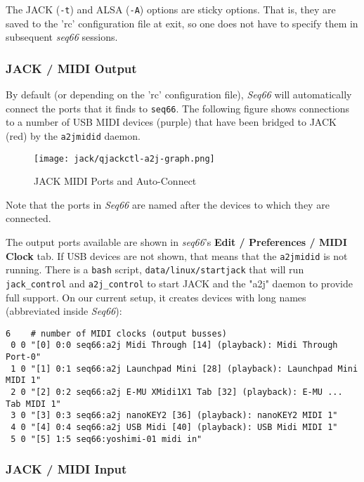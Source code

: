    The JACK (\texttt{-t}) and ALSA (\texttt{-A}) options are sticky options.
   That is, they are saved to the 'rc' configuration file at exit,
   so one does not have to specify them in subsequent \textsl{seq66} sessions.

\subsubsection{JACK / MIDI Output}
\label{subsubsec:jack_midi_output}

   By default (or depending on the 'rc' configuration file),
   \textsl{Seq66} will
   automatically connect the ports that it finds to \texttt{seq66}.
   The following figure shows connections to a number of USB MIDI devices
   (purple) that have been bridged to JACK (red) by the \texttt{a2jmidid}
   daemon.

\begin{figure}[H]
   \centering 
   \texttt{[image: jack/qjackctl-a2j-graph.png]}
   \caption{JACK MIDI Ports and Auto-Connect}
   \label{fig:jack_midi_ports_auto_connect}
\end{figure}

   Note that the ports in \textsl{Seq66} are named after the devices to which
   they are connected.

	The output ports available are shown in \textsl{seq66}'s
	\textbf{Edit / Preferences / MIDI Clock} tab.
   If USB devices are not shown, that means
   that the \texttt{a2jmidid} is not running.
   There is a \texttt{bash} script, \texttt{data/linux/startjack}
   that will run \texttt{jack\_control} and \texttt{a2j\_control} to start JACK
   and the "a2j" daemon to provide full support.
   On our current setup, it creates devices with long names (abbreviated inside
   \textsl{Seq66}):

   \begin{verbatim}
6    # number of MIDI clocks (output busses)
 0 0 "[0] 0:0 seq66:a2j Midi Through [14] (playback): Midi Through Port-0"
 1 0 "[1] 0:1 seq66:a2j Launchpad Mini [28] (playback): Launchpad Mini MIDI 1"
 2 0 "[2] 0:2 seq66:a2j E-MU XMidi1X1 Tab [32] (playback): E-MU ... Tab MIDI 1"
 3 0 "[3] 0:3 seq66:a2j nanoKEY2 [36] (playback): nanoKEY2 MIDI 1"
 4 0 "[4] 0:4 seq66:a2j USB Midi [40] (playback): USB Midi MIDI 1"
 5 0 "[5] 1:5 seq66:yoshimi-01 midi in"
   \end{verbatim}

\subsubsection{JACK / MIDI Input}
\label{subsubsec:jack_midi_input}

